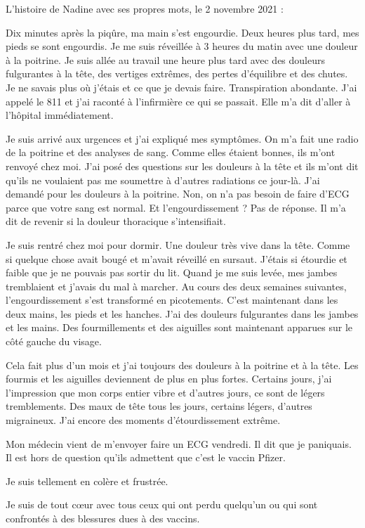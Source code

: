 L'histoire de Nadine avec ses propres mots, le 2 novembre 2021 :

Dix minutes après la piqûre, ma main s'est engourdie. Deux heures plus tard, mes
pieds se sont engourdis. Je me suis réveillée à 3 heures du matin avec une
douleur à la poitrine. Je suis allée au travail une heure plus tard avec des
douleurs fulgurantes à la tête, des vertiges extrêmes, des pertes d'équilibre et
des chutes. Je ne savais plus où j'étais et ce que je devais
faire. Transpiration abondante. J'ai appelé le 811 et j'ai raconté à
l'infirmière ce qui se passait. Elle m'a dit d'aller à l'hôpital immédiatement.

Je suis arrivé aux urgences et j'ai expliqué mes symptômes. On m'a fait une
radio de la poitrine et des analyses de sang. Comme elles étaient bonnes, ils
m'ont renvoyé chez moi. J'ai posé des questions sur les douleurs à la tête et
ils m'ont dit qu'ils ne voulaient pas me soumettre à d'autres radiations ce
jour-là. J'ai demandé pour les douleurs à la poitrine. Non, on n'a pas besoin de
faire d'ECG parce que votre sang est normal. Et l'engourdissement ? Pas de
réponse. Il m'a dit de revenir si la douleur thoracique s'intensifiait.

Je suis rentré chez moi pour dormir. Une douleur très vive dans la tête. Comme
si quelque chose avait bougé et m'avait réveillé en sursaut. J'étais si étourdie
et faible que je ne pouvais pas sortir du lit. Quand je me suis levée, mes
jambes tremblaient et j'avais du mal à marcher. Au cours des deux semaines
suivantes, l'engourdissement s'est transformé en picotements. C'est maintenant
dans les deux mains, les pieds et les hanches. J'ai des douleurs fulgurantes
dans les jambes et les mains. Des fourmillements et des aiguilles sont
maintenant apparues sur le côté gauche du visage.

Cela fait plus d'un mois et j'ai toujours des douleurs à la poitrine et à la
tête. Les fourmis et les aiguilles deviennent de plus en plus fortes. Certains
jours, j'ai l'impression que mon corps entier vibre et d'autres jours, ce sont
de légers tremblements. Des maux de tête tous les jours, certains légers,
d'autres migraineux. J'ai encore des moments d'étourdissement extrême.

Mon médecin vient de m'envoyer faire un ECG vendredi. Il dit que je
paniquais. Il est hors de question qu'ils admettent que c'est le vaccin Pfizer.

Je suis tellement en colère et frustrée.

Je suis de tout cœur avec tous ceux qui ont perdu quelqu'un ou qui sont
confrontés à des blessures dues à des vaccins.
